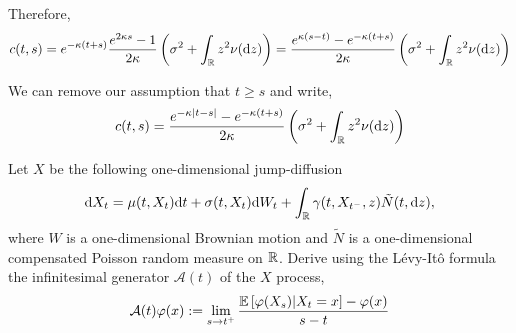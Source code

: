 \begin{solution}[Solution]
\begin{enumerate}[label=(\alph*)]
        Therefore, 
        \begin{align*}
            c(t,s) 
            = e^{-\kappa(t+s)}\dfrac{e^{2\kappa s}-1}{2\kappa} \left(\sigma^2 + \int_{\mathbb{R}} z^2 \nu(\mathrm{d} z) \right)
            = \dfrac{e^{\kappa(s-t)}-e^{-\kappa(t+s)}}{2\kappa} \left(\sigma^2 + \int_{\mathbb{R}} z^2 \nu(\mathrm{d} z) \right)
        \end{align*} 

        We can remove our assumption that \( t\geq s \) and write,
        \begin{align*}
            c(t,s)  
            = \dfrac{e^{-\kappa|t-s|} - e^{-\kappa(t+s)}}{2\kappa} \left(\sigma^2 + \int_{\mathbb{R}} z^2 \nu(\mathrm{d} z) \right)
        \end{align*}
\end{enumerate}
\end{solution}

\begin{problem}[Exercise 10.5]
Let \( X \) be the following one-dimensional jump-diffusion
\begin{align*}
    \mathrm{d} X_t = \mu(t,X_t)\mathrm{d} t + \sigma(t,X_t)\mathrm{d} W_t + \int_{\mathbb{R}} \gamma(t,X_{t^-},z) \tilde{N}(t,\mathrm{d} z),
\end{align*}
    where \( W \) is a one-dimensional Brownian motion and \( \tilde{N} \) is a one-dimensional compensated Poisson random measure on \( \mathbb{R} \). Derive using the L\'evy-It\^o formula the infinitesimal generator \( \mathcal{A} (t) \) of the \( X \) process,
    \begin{align*}
        \mathcal{A}(t) \varphi(x) := \lim_{s\to t^+} \dfrac{\mathbb{E} \left[ \varphi(X_s) | X_t = x \right]-\varphi(x)}{s-t}
    \end{align*}
\end{problem}


